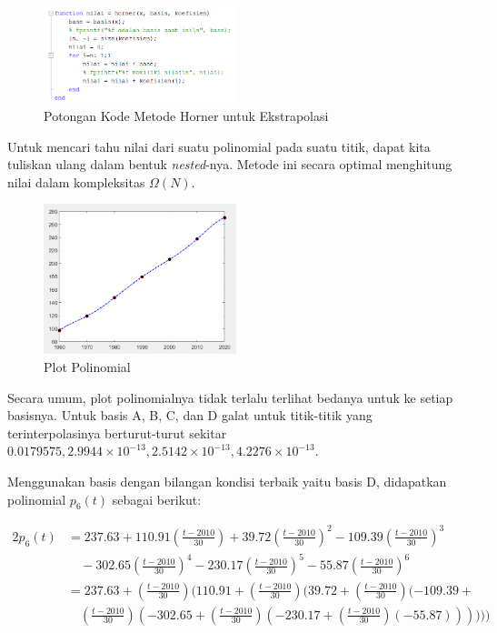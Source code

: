 \documentclass[11pt, a4paper, onecolumn, oneside, final]{report}
\begin{document}
\begin{figure}[h!]
    \centering
    \includegraphics[width=0.5\textwidth]{assets/Horner.png}
    \caption{Potongan Kode Metode Horner untuk Ekstrapolasi}
\end{figure}

Untuk mencari tahu nilai dari suatu polinomial pada suatu titik, dapat kita tuliskan ulang dalam bentuk \textit{nested}-nya. Metode ini secara optimal menghitung nilai dalam kompleksitas $\Omega(N)$.

\begin{figure}[h!]
    \centering
    \includegraphics[width=0.5\textwidth]{assets/Plot1.png}
    \caption{Plot Polinomial}
\end{figure}

Secara umum, plot polinomialnya tidak terlalu terlihat bedanya untuk ke setiap basisnya. Untuk basis A, B, C, dan D galat untuk titik-titik yang terinterpolasinya berturut-turut sekitar $0.0179575, 2.9944 \times 10^{-13}, 2.5142 \times 10^{-13}, 4.2276 \times 10^{-13}$.

Menggunakan basis dengan bilangan kondisi terbaik yaitu basis D, didapatkan polinomial $p_6(t)$ sebagai berikut:

\begin{alignat*}{2}
    p_6(t) &= 237.63 + 110.91 (\frac{t - 2010}{30}) + 39.72 (\frac{t - 2010}{30})^2 - 109.39 (\frac{t - 2010}{30})^3 \\
           &\quad- 302.65 (\frac{t - 2010}{30})^4 - 230.17 (\frac{t - 2010}{30})^5 - 55.87 (\frac{t - 2010}{30})^6 \\ 
          &= 237.63 + (\frac{t - 2010}{30}) (110.91 + (\frac{t - 2010}{30}) (39.72 +  (\frac{t - 2010}{30}) (-109.39 + \\ & \quad (\frac{t - 2010}{30}) (-302.65 + (\frac{t - 2010}{30})(-230.17 + (\frac{t - 2010}{30}) (-55.87))))))
\end{alignat*}
\end{document}
